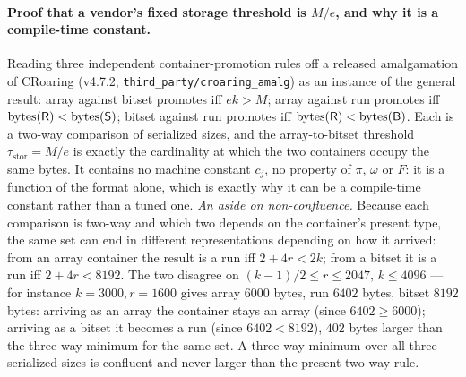 \paragraph*{Proof that a vendor's fixed storage threshold is $M/e$, and why it is a compile-time constant.}
Reading three independent container-promotion rules off a released amalgamation of CRoaring (v4.7.2,
\texttt{third\_party/croaring\_amalg}) as an instance of the general result: array against bitset
promotes iff $ek>M$; array against run promotes iff $\mathrm{bytes}(\textsf{R})<\mathrm{bytes}(\textsf{S})$; bitset
against run promotes iff $\mathrm{bytes}(\textsf{R})<\mathrm{bytes}(\textsf{B})$. Each is a two-way comparison of
serialized sizes, and the array-to-bitset threshold $\tau_{\mathrm{stor}}=M/e$ is exactly the
cardinality at which the two containers occupy the same bytes. It contains no machine constant $c_j$,
no property of $\pi$, $\omega$ or $F$: it is a function of the format alone, which is exactly why it
can be a compile-time constant rather than a tuned one. \emph{An aside on non-confluence.} Because each
comparison is two-way and which two depends on the container's present type, the same set can end in
different representations depending on how it arrived: from an array container the result is a run iff
$2+4r<2k$; from a bitset it is a run iff $2+4r<8192$. The two disagree on
$(k-1)/2\le r\le2047,\,k\le4096$ --- for instance $k=3000,r=1600$ gives array $6000$ bytes, run $6402$
bytes, bitset $8192$ bytes: arriving as an array the container stays an array (since $6402\ge6000$);
arriving as a bitset it becomes a run (since $6402<8192$), $402$ bytes larger than the three-way
minimum for the same set. A three-way minimum over all three serialized sizes is confluent and never
larger than the present two-way rule.

